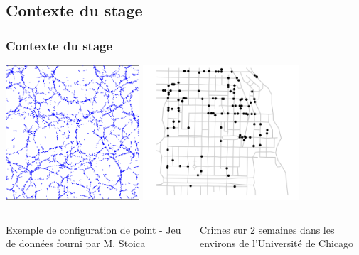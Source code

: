\documentclass{beamer}
\theoremstyle{remark}
\theoremstyle{plain}
\begin{document}
\subsection{Contexte du stage}
\begin{frame}
  \frametitle{Contexte du stage}
   \hspace{0.2cm}
  \includegraphics[height=5cm]{images/exempleConfiguration.png}
  \hspace{0.5cm}
  \includegraphics[height=5cm]{images/crimesChicago.png}\\
  
  \begin{columns}
    \begin{column}{0.45\linewidth}
      \begin{center}
        Exemple de configuration de point - Jeu de données fourni par M. Stoica
      \end{center}
    \end{column}
    \begin{column}{0.45\linewidth}
      \begin{center}
        Crimes sur 2 semaines dans les environs de l'Université de Chicago \cite{BaddEtal16}
      \end{center}
    \end{column}
  \end{columns}
  
  
\end{frame}
\end{document}
